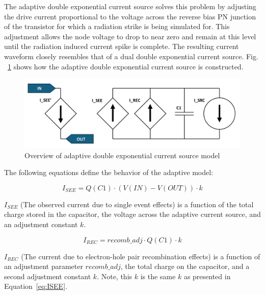\documentclass[conference]{IEEEtran}
\begin{document}
    The adaptive double exponential current source solves this problem by adjusting the drive current proportional to the voltage across the reverse bias PN junction of the transistor for which a radiation strike is being simulated for.
    This adjustment allows the node voltage to drop to near zero and remain at this level until the radiation induced current spike is complete.
    The resulting current waveform closely resembles that of a dual double exponential current source. Fig. ~\ref{fig:adaptive_model_overview} shows how the adaptive double exponential current source is constructed.

    \begin{figure}[htbp]
        \centering
        \includegraphics[width=0.95\linewidth]{Adaptive_Model_Cropped}
        \caption{Overview of adaptive double exponential current source model \cite{Kauppila2009}}
        \label{fig:adaptive_model_overview}
    \end{figure}

    The following equations define the behavior of the adaptive model:

    \begin{equation}
        I_{SEE} = Q(C1) \cdot (V(IN) - V(OUT)) \cdot k\label{eq:ISEE}
    \end{equation}

    \(I_{SEE}\) (The observed current due to single event effects) is a function of the total charge stored in the capacitor, the voltage across the adaptive current source, and an adjustment constant \(k\).

    \begin{equation}
        I_{REC} = recomb\_adj \cdot Q(C1) \cdot k\label{eq:IREC}
    \end{equation}

    \(I_{REC}\) (The current due to electron-hole pair recombination effects) is a function of an adjustment parameter \(recomb\_adj\), the total charge on the capacitor, and a second adjustment constant \(k\).
    Note, this \(k\) is the same \(k\) as presented in Equation~\ref{eq:ISEE}.
\end{document}
